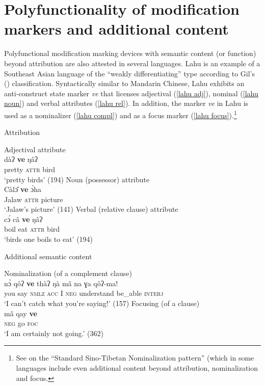 \section[Polyfunctionality and additional content]{Polyfunctionality of modification markers and additional content}
Polyfunctional modification marking devices with semantic content (or function) beyond attribution are also attested in several languages. Lahu is an example of a Southeast Asian language of the “weakly differentiating” type according to Gil's (\citeyear{gil2005}) classification. Syntactically similar to Mandarin Chinese, Lahu exhibits an anti\hyp{}construct state marker \textit{ve} that licenses adjectival (\ref{lahu adj}), nominal (\ref{lahu noun}) and verbal attributes (\ref{lahu rel}). In addition, the marker \textit{ve} in Lahu is used as a nominalizer (\ref{lahu compl}) and as a focus marker (\ref{lahu focus}).\footnote{See \citealt{bickel1999} on the “Standard Sino-Tibetan Nominalization pattern” (which in some languages include even additional content beyond attribution, nominalization and focus.}
\begin{exe}
\ex
{}
\begin{xlist}
\ex	\rm{Attribution}
\begin{xlist}
\ex	\rm{Adjectival attribute}\\
\gll	dàʔ	\textbf{ve}	ŋâʔ\\
	pretty	\textsc{attr}	bird\\
\glt	‘pretty birds’ (194)\label{lahu adj}
\ex	\rm{Noun (possessor) attribute}\\
\gll	Càl\^{ɔ}	\textbf{ve}	\`{ɔ}ha\\
	Jalaw	\textsc{attr}	picture\\
\glt	‘Jalaw's picture’ (141)\label{lahu noun}
\ex	\rm{Verbal (relative clause) attribute}\\
\gll	c\'{ɔ}	câ	\textbf{ve}	ŋâʔ\\
	boil	eat	\textsc{attr}	bird\\
\glt	‘birds one boils to eat’ (194)\label{lahu rel}
\end{xlist}
\ex	\rm{Additional semantic content}
\begin{xlist}
\ex \rm{Nominalization (of a complement clause)}\\
\gll	n\`{ɔ}	qôʔ \textbf{ve}	thàʔ	ŋà mâ	na ɣa	qôʔ-ma!\\
	you	say \textsc{nmlz}	\textsc{acc} I	\textsc{neg} understand	be\_able	\textsc{interj}\\
\glt	‘I can't catch what you're saying!’ (157)\label{lahu compl}
\ex	\rm{Focusing (of a clause)}\\
\gll	mâ		qay	\textbf{ve}\\
	\textsc{neg}	go	\textsc{foc}\\
\glt	‘I am certainly not going.’ (362)\label{lahu focus}
\end{xlist}
\end{xlist}
\end{exe}
